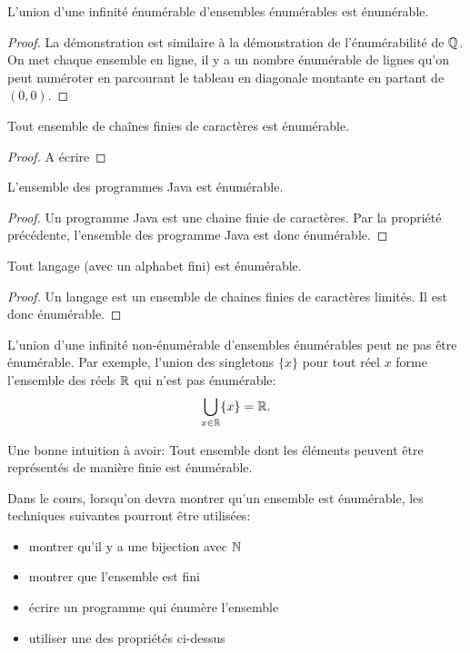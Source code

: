 \begin{myprop}
	L'union d'une infinité énumérable d'ensembles énumérables est énumérable.
    \begin{proof}
      La démonstration est similaire à la démonstration de l'énumérabilité de $\mathbb{Q}$.
      On met chaque ensemble en ligne, il y a un nombre énumérable de lignes qu'on peut numéroter en parcourant le tableau en diagonale montante en partant de $(0,0)$.
    \end{proof}
\end{myprop}

\begin{myprop}
 Tout ensemble de chaînes finies de caractères est énumérable.
 \begin{proof}
	A écrire
 \end{proof}
\end{myprop}

\begin{myprop}
 L'ensemble des programmes Java est énumérable.
 \begin{proof}
  Un programme Java est une chaine finie de caractères.  Par la propriété précédente, l'ensemble des programme Java est  donc énumérable.
 \end{proof}
\end{myprop}


\begin{myprop}
 Tout langage (avec un alphabet fini) est énumérable. 
 \begin{proof}
 Un langage est un ensemble de chaines finies de caractères limités.  Il est donc  énumérable.
 \end{proof}
\end{myprop}

L'union d'une infinité non-énumérable d'ensembles énumérables peut ne pas être énumérable.
Par exemple, l'union des singletons $\{x\}$ pour tout réel $x$ forme l'ensemble des réels $\mathbb{R}$ qui n'est pas énumérable:
\[ \bigcup_{x \in \mathbb{R}} \{x\} = \mathbb{R}. \]

\begin{myrem}
  Une bonne intuition à avoir:
  Tout ensemble dont les éléments peuvent être représentés de manière finie est énumérable.
\end{myrem}

Dans le cours, lorsqu'on devra montrer qu'un ensemble est énumérable,
les techniques suivantes pourront être utilisées:
\begin{itemize}
	\item montrer qu'il y a une bijection avec $\mathbb{N}$ 
	\item montrer que l'ensemble est fini
	\item écrire un programme qui énumère l'ensemble
	\item utiliser une des propriétés ci-dessus
\end{itemize}

